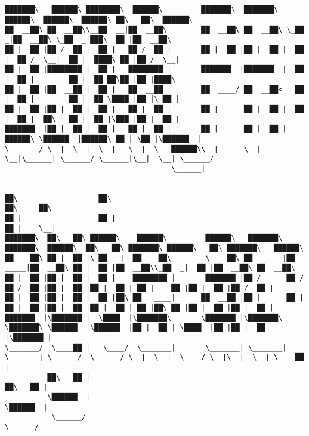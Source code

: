 \documentclass[varwidth=\maxdimen,margin=0.5cm,multi={verbatim}]{standalone}
\begin{document}
\begin{verbatim}


███████\   ██████\ ████████\  ██████\         ███████\  ███████\  ██████\  ██████\  ██████\ ██\   ██\  ██████\
██  __██\ ██  __██\\__██  __|██  __██\        ██  __██\ ██  __██\ \_██  _|██  __██\ \_██  _|███\  ██ |██  __██\
██ |  ██ |██ /  ██ |  ██ |   ██ /  ██ |       ██ |  ██ |██ |  ██ |  ██ |  ██ /  \__|  ██ |  ████\ ██ |██ /  \__|
██ |  ██ |████████ |  ██ |   ████████ |       ███████  |███████  |  ██ |  ██ |        ██ |  ██ ██\██ |██ |████\
██ |  ██ |██  __██ |  ██ |   ██  __██ |       ██  ____/ ██  __██<   ██ |  ██ |        ██ |  ██ \████ |██ |\_██ |
██ |  ██ |██ |  ██ |  ██ |   ██ |  ██ |       ██ |      ██ |  ██ |  ██ |  ██ |  ██\   ██ |  ██ |\███ |██ |  ██ |
███████  |██ |  ██ |  ██ |   ██ |  ██ |       ██ |      ██ |  ██ |██████\ \██████  |██████\ ██ | \██ |\██████  |
\_______/ \__|  \__|  \__|   \__|  \__|██████\\__|      \__|  \__|\______| \______/ \______|\__|  \__| \______/
                                       \______|


██\                   ██\                                                                                  ██\     ██\
██ |                  ██ |                                                                                 ██ |    \__|
███████\  ██\   ██\ ██████\    ██████\         ██████\   ███████\  ███████\  ██████\  ██\   ██\ ███████\ ██████\   ██\ ███████\   ██████\
██  __██\ ██ |  ██ |\_██  _|  ██  __██\        \____██\ ██  _____|██  _____|██  __██\ ██ |  ██ |██  __██\\_██  _|  ██ |██  __██\ ██  __██\
██ |  ██ |██ |  ██ |  ██ |    ████████ |       ███████ |██ /      ██ /      ██ /  ██ |██ |  ██ |██ |  ██ | ██ |    ██ |██ |  ██ |██ /  ██ |
██ |  ██ |██ |  ██ |  ██ |██\ ██   ____|      ██  __██ |██ |      ██ |      ██ |  ██ |██ |  ██ |██ |  ██ | ██ |██\ ██ |██ |  ██ |██ |  ██ |
███████  |\███████ |  \████  |\███████\       \███████ |\███████\ \███████\ \██████  |\██████  |██ |  ██ | \████  |██ |██ |  ██ |\███████ |
\_______/  \____██ |   \____/  \_______|       \_______| \_______| \_______| \______/  \______/ \__|  \__|  \____/ \__|\__|  \__| \____██ |
          ██\   ██ |                                                                                                             ██\   ██ |
          \██████  |                                                                                                             \██████  |
           \______/                                                                                                               \______/





\end{verbatim}
\end{document}
